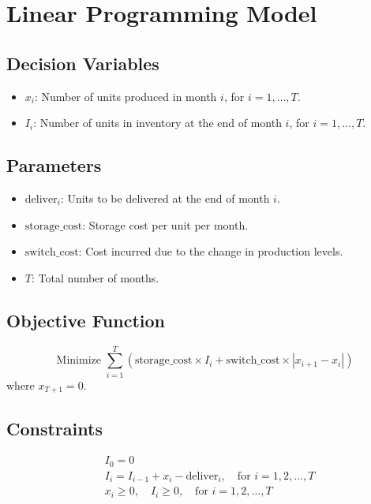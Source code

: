 \documentclass{article}
\begin{document}
\section*{Linear Programming Model}

\subsection*{Decision Variables}
\begin{itemize}
    \item \( x_i \): Number of units produced in month \( i \), for \( i = 1, \ldots, T \).
    \item \( I_i \): Number of units in inventory at the end of month \( i \), for \( i = 1, \ldots, T \).
\end{itemize}

\subsection*{Parameters}
\begin{itemize}
    \item \( \text{deliver}_i \): Units to be delivered at the end of month \( i \).
    \item \( \text{storage\_cost} \): Storage cost per unit per month.
    \item \( \text{switch\_cost} \): Cost incurred due to the change in production levels.
    \item \( T \): Total number of months.
\end{itemize}

\subsection*{Objective Function}
\[
\text{Minimize } \sum_{i=1}^{T} \left( \text{storage\_cost} \times I_i + \text{switch\_cost} \times |x_{i+1} - x_i| \right)
\]
where \( x_{T+1} = 0 \).

\subsection*{Constraints}
\begin{align*}
    & I_0 = 0 \\
    & I_i = I_{i-1} + x_i - \text{deliver}_i, \quad \text{for } i = 1, 2, \ldots, T \\
    & x_i \geq 0, \quad I_i \geq 0, \quad \text{for } i = 1, 2, \ldots, T
\end{align*}
\end{document}
